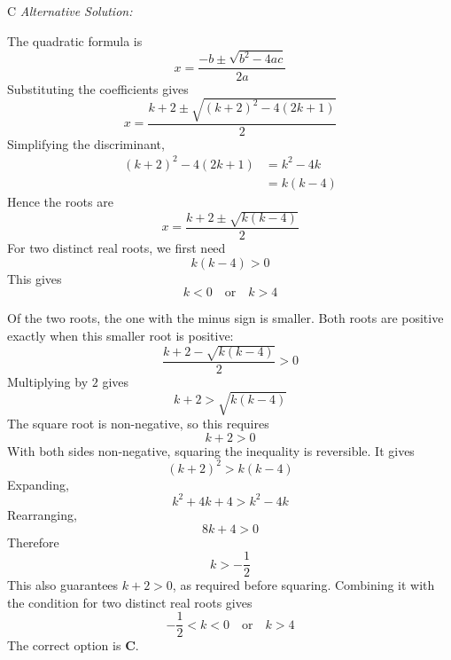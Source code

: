 \documentclass[11pt,a4paper]{article}
\begin{document}
\begin{enumerate}[label=\textbf{\arabic*.},leftmargin=*,itemsep=0pt,start=10]
\begin{djsSolution}{C}
\textit{Alternative Solution:}

The quadratic formula is
\[
x=\frac{-b\pm\sqrt{b^2-4ac}}{2a}
\]
Substituting the coefficients gives
\[
x=\frac{k+2\pm\sqrt{(k+2)^2-4(2k+1)}}{2}
\]
Simplifying the discriminant,
\[
\begin{aligned}
(k+2)^2-4(2k+1)
&=k^2-4k\\
&=k(k-4)
\end{aligned}
\]
Hence the roots are
\[
x=\frac{k+2\pm\sqrt{k(k-4)}}{2}
\]
For two distinct real roots, we first need
\[
k(k-4)>0
\]
This gives
\[
k<0\quad\text{or}\quad k>4
\]

Of the two roots, the one with the minus sign is smaller. Both roots are positive exactly when this smaller root is positive:
\[
\frac{k+2-\sqrt{k(k-4)}}{2}>0
\]
Multiplying by $2$ gives
\[
k+2>\sqrt{k(k-4)}
\]
The square root is non-negative, so this requires
\[
k+2>0
\]
With both sides non-negative, squaring the inequality is reversible. It gives
\[
(k+2)^2>k(k-4)
\]
Expanding,
\[
k^2+4k+4>k^2-4k
\]
Rearranging,
\[
8k+4>0
\]
Therefore
\[
k>-\frac12
\]
This also guarantees $k+2>0$, as required before squaring. Combining it with the condition for two distinct real roots gives
\[
-\frac12<k<0\quad\text{or}\quad k>4
\]
The correct option is \textbf{C}.
\end{djsSolution}
\end{enumerate}
\clearpage
\thispagestyle{djssolutions}
\vspace*{8pt}
\end{document}
